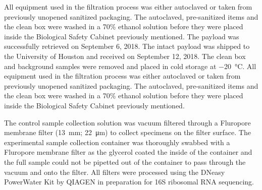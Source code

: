  All equipment used in the filtration process was either autoclaved or taken from previously unopened sanitized packaging. The autoclaved, pre-sanitized items and the clean box were washed in a 70\% ethanol solution before they were placed inside the Biological Safety Cabinet previously mentioned. 
 The payload was successfully retrieved on September 6, 2018. The intact payload was shipped to the University of Houston and received on September 12, 2018. The clean box and background samples were removed and placed in cold storage at \SI{-20}{\celsius}. All equipment used in the filtration process was either autoclaved or taken from previously unopened sanitized packaging. The autoclaved, pre-sanitized items and the clean box were washed in a 70\% ethanol solution before they were placed inside the Biological Safety Cabinet previously mentioned. 
 
The control sample collection solution was vacuum filtered through a Fluropore membrane filter (\SI{13}{\milli\meter}; \SI{22}{\micro\meter}) to collect specimens on the filter surface. The experimental sample collection container was thoroughly swabbed with a Fluropore membrane filter as the glycerol coated the inside of the container and the full sample could not be pipetted out of the container to pass through the vacuum and onto the filter. All filters were processed using the DNeasy PowerWater Kit by QIAGEN \cite{PowerWaterKit} in preparation for 16S ribosomal RNA sequencing.   